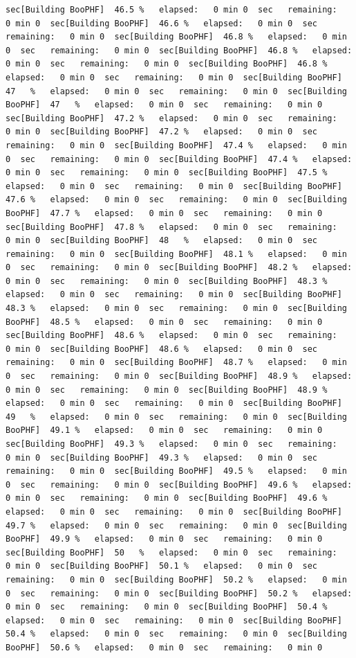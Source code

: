 \documentclass[
]{book}
\begin{document}
\begin{verbatim}
sec[Building BooPHF]  46.5 %   elapsed:   0 min 0  sec   remaining:   0 min 0  sec[Building BooPHF]  46.6 %   elapsed:   0 min 0  sec   remaining:   0 min 0  sec[Building BooPHF]  46.8 %   elapsed:   0 min 0  sec   remaining:   0 min 0  sec[Building BooPHF]  46.8 %   elapsed:   0 min 0  sec   remaining:   0 min 0  sec[Building BooPHF]  46.8 %   elapsed:   0 min 0  sec   remaining:   0 min 0  sec[Building BooPHF]  47   %   elapsed:   0 min 0  sec   remaining:   0 min 0  sec[Building BooPHF]  47   %   elapsed:   0 min 0  sec   remaining:   0 min 0  sec[Building BooPHF]  47.2 %   elapsed:   0 min 0  sec   remaining:   0 min 0  sec[Building BooPHF]  47.2 %   elapsed:   0 min 0  sec   remaining:   0 min 0  sec[Building BooPHF]  47.4 %   elapsed:   0 min 0  sec   remaining:   0 min 0  sec[Building BooPHF]  47.4 %   elapsed:   0 min 0  sec   remaining:   0 min 0  sec[Building BooPHF]  47.5 %   elapsed:   0 min 0  sec   remaining:   0 min 0  sec[Building BooPHF]  47.6 %   elapsed:   0 min 0  sec   remaining:   0 min 0  sec[Building BooPHF]  47.7 %   elapsed:   0 min 0  sec   remaining:   0 min 0  sec[Building BooPHF]  47.8 %   elapsed:   0 min 0  sec   remaining:   0 min 0  sec[Building BooPHF]  48   %   elapsed:   0 min 0  sec   remaining:   0 min 0  sec[Building BooPHF]  48.1 %   elapsed:   0 min 0  sec   remaining:   0 min 0  sec[Building BooPHF]  48.2 %   elapsed:   0 min 0  sec   remaining:   0 min 0  sec[Building BooPHF]  48.3 %   elapsed:   0 min 0  sec   remaining:   0 min 0  sec[Building BooPHF]  48.3 %   elapsed:   0 min 0  sec   remaining:   0 min 0  sec[Building BooPHF]  48.5 %   elapsed:   0 min 0  sec   remaining:   0 min 0  sec[Building BooPHF]  48.6 %   elapsed:   0 min 0  sec   remaining:   0 min 0  sec[Building BooPHF]  48.6 %   elapsed:   0 min 0  sec   remaining:   0 min 0  sec[Building BooPHF]  48.7 %   elapsed:   0 min 0  sec   remaining:   0 min 0  sec[Building BooPHF]  48.9 %   elapsed:   0 min 0  sec   remaining:   0 min 0  sec[Building BooPHF]  48.9 %   elapsed:   0 min 0  sec   remaining:   0 min 0  sec[Building BooPHF]  49   %   elapsed:   0 min 0  sec   remaining:   0 min 0  sec[Building BooPHF]  49.1 %   elapsed:   0 min 0  sec   remaining:   0 min 0  sec[Building BooPHF]  49.3 %   elapsed:   0 min 0  sec   remaining:   0 min 0  sec[Building BooPHF]  49.3 %   elapsed:   0 min 0  sec   remaining:   0 min 0  sec[Building BooPHF]  49.5 %   elapsed:   0 min 0  sec   remaining:   0 min 0  sec[Building BooPHF]  49.6 %   elapsed:   0 min 0  sec   remaining:   0 min 0  sec[Building BooPHF]  49.6 %   elapsed:   0 min 0  sec   remaining:   0 min 0  sec[Building BooPHF]  49.7 %   elapsed:   0 min 0  sec   remaining:   0 min 0  sec[Building BooPHF]  49.9 %   elapsed:   0 min 0  sec   remaining:   0 min 0  sec[Building BooPHF]  50   %   elapsed:   0 min 0  sec   remaining:   0 min 0  sec[Building BooPHF]  50.1 %   elapsed:   0 min 0  sec   remaining:   0 min 0  sec[Building BooPHF]  50.2 %   elapsed:   0 min 0  sec   remaining:   0 min 0  sec[Building BooPHF]  50.2 %   elapsed:   0 min 0  sec   remaining:   0 min 0  sec[Building BooPHF]  50.4 %   elapsed:   0 min 0  sec   remaining:   0 min 0  sec[Building BooPHF]  50.4 %   elapsed:   0 min 0  sec   remaining:   0 min 0  sec[Building BooPHF]  50.6 %   elapsed:   0 min 0  sec   remaining:   0 min 0  
\end{verbatim}
\end{document}
